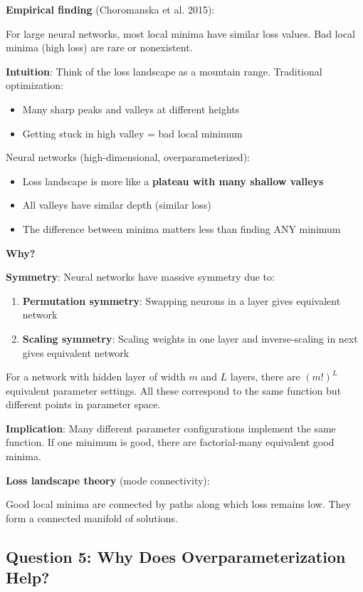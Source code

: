 \textbf{Empirical finding} (Choromanska et al. 2015):

For large neural networks, most local minima have similar loss values. Bad local minima (high loss) are rare or nonexistent.

\textbf{Intuition}: Think of the loss landscape as a mountain range. Traditional optimization:
\begin{itemize}
\item Many sharp peaks and valleys at different heights
\item Getting stuck in high valley = bad local minimum
\end{itemize}

Neural networks (high-dimensional, overparameterized):
\begin{itemize}
\item Loss landscape is more like a \textbf{plateau with many shallow valleys}
\item All valleys have similar depth (similar loss)
\item The difference between minima matters less than finding ANY minimum
\end{itemize}

\textbf{Why?}

\textbf{Symmetry}: Neural networks have massive symmetry due to:
\begin{enumerate}
\item \textbf{Permutation symmetry}: Swapping neurons in a layer gives equivalent network
\item \textbf{Scaling symmetry}: Scaling weights in one layer and inverse-scaling in next gives equivalent network
\end{enumerate}

For a network with hidden layer of width $m$ and $L$ layers, there are $(m!)^L$ equivalent parameter settings. All these correspond to the same function but different points in parameter space.

\textbf{Implication}: Many different parameter configurations implement the same function. If one minimum is good, there are factorial-many equivalent good minima.

\textbf{Loss landscape theory} (mode connectivity):

Good local minima are connected by paths along which loss remains low. They form a connected manifold of solutions.

\subsection{Question 5: Why Does Overparameterization Help?}

